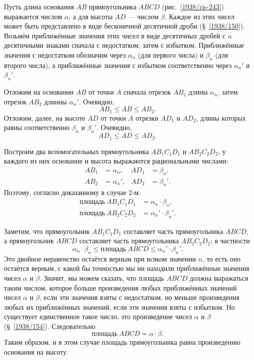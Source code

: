 \documentclass[twoside]{book}
\begin{document}
Пусть длина основания $AB$ прямоугольника $ABCD$ (рис.~\ref{1938/ris-243}) выражается  числом $\alpha$, а для высоты $AD$ — числом $\beta$.
Каждое из этих чисел может быть представлено в виде бесконечной десятичной дроби (§~\ref{1938/150}).
Возьмём приближённые значения этих чисел в виде десятичных дробей с $n$ десятичными знаками сначала с недостатком, затем с избытком.
Приближённые значения с недостатком обозначим через $\alpha_n$ (для первого числа) и $\beta_n$ (для второго числа), а приближённые значения с избытком соответственно через  $\alpha_n'$ и $\beta_n'$.

Отложим на основании $AB$ от точки $A$ сначала отрезок $AB_1$ длины $\alpha_n$, затем отрезок $AB_2$ длинны  $\alpha_n'$.
Очевидно, 
\[AB_1\le AB\le AB_2.\]
Отложим, далее, на высоте $AD$ от точки $A$ отрезки $AD_1$ и $AD_2$, длины которых равны соответственно $\beta_n$ и $\beta_n'$.
Очевидно, 
\[AD_1\le AD\le AD_2.\]

{\sloppy

Построим два вспомогательных прямоугольника $AB_1C_1D_1$ и $AB_2C_2D_2$, у каждого из них основание и высота выражаются рациональными числами:
\begin{align*}
AB_1&=\alpha_n,
&
AD_1&=\beta_n,
\\
AB_2&=\alpha_n',
&
AD_2&=\beta_n'.
\end{align*}
Поэтому, согласно доказанному в случае 2-м.
\begin{align*}
\text{площадь}~AB_1C_1D_1 &= \alpha_n\cdot \beta_n, 
\\
\text{площадь}~AB_2C_2D_2 &= \alpha_n'\cdot \beta_n'. 
\end{align*}

}

Заметим, что прямоугольник $AB_1C_1D_1$ составляет часть прямоугольника $ABCD$, 
а прямоугольник $ABCD$ составляет часть прямоугольника $AB_2C_2D_2$;
в частности
\[\alpha_n\cdot \beta_n\le\text{площадь}~ABCD\le\alpha_n'\cdot \beta_n'.\]
Это двойное неравенство остаётся верным при всяком значении $n$, то есть оно остаётся верным, с какой бы точностью мы ни находили приближённые значения чисел $\alpha$ и $\beta$.
Значит, мы можем сказать, что площадь $ABCD$ должна выражаться таким числом, которое больше произведения любых приближённых значений чисел $\alpha$ и $\beta$, если эти значения взяты с недостатком, но меньше произведения любых их приближённых значений, если эти значения взяты с избытком.
Но существует единственное такое число, это произведение чисел $\alpha$ и $\beta$ (§~\ref{1938/154}).
Следовательно 
\[\text{площадь}~ABCD=\alpha\cdot \beta.\]
Таким образом, и в этом случае площадь прямоугольника равна произведению основания на высоту.
\end{document}
